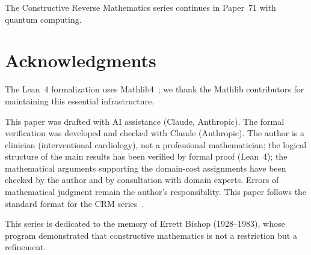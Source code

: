 \documentclass[11pt]{article}
\theoremstyle{definition}
\theoremstyle{remark}
\begin{document}
\bigskip

The Constructive Reverse Mathematics series continues in Paper~71 with quantum computing.

\section*{Acknowledgments}

The Lean~4 formalization uses Mathlib4~\cite{mathlib}; we thank the
Mathlib contributors for maintaining this essential infrastructure.

This paper was drafted with AI assistance (Claude, Anthropic).
The formal verification was developed and checked with Claude
(Anthropic).  The author is a clinician (interventional
cardiology), not a professional mathematician; the logical structure
of the main results has been verified by formal proof (Lean~4); the
mathematical arguments supporting the domain-cost assignments have been
checked by the author and by consultation with domain experts.
Errors of mathematical judgment remain the author's responsibility.
This paper follows the standard format for the CRM
series~\cite{format-guide}.

This series is dedicated to the memory of Errett Bishop (1928--1983),
whose program demonstrated that constructive mathematics is not a
restriction but a refinement.
\end{document}
